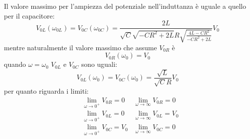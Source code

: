 Il valore massimo per l'ampiezza del potenziale nell'induttanza è uguale a quello per il capacitore:
\begin{equation}
  V_{0L}(\omega_{0L})=V_{0C}(\omega_{0C})=\frac{2L}{\sqrt{C}\sqrt{-CR^2+2L}R\sqrt{\frac{4L-CR^2}{-CR^2+2L}}}V_0
\end{equation}
mentre naturalmente il valore massimo che assume $V_{0R}$ è
\begin{equation}
  V_{0R}(\omega_0)=V_0
\end{equation}
quando $\omega=\omega_0$ $V_{0L}$ e $V_{0C}$ sono uguali:
\begin{equation}
  V_{0L}(\omega_0)=V_{0C}(\omega_0)=\frac{\sqrt{L}}{\sqrt{C}R}V_0
\end{equation}
per quanto riguarda i limiti:
\begin{subequations}
  \begin{align}
     & \lim_{\omega\to 0^+}V_{0R}=0   & \lim_{\omega\to \infty}V_{0R}=0   \\
     & \lim_{\omega\to 0^+}V_{0L}=0   & \lim_{\omega\to \infty}V_{0L}=V_0 \\
     & \lim_{\omega\to 0^+}V_{0C}=V_0 & \lim_{\omega\to \infty}V_{0C}=0
  \end{align}
\end{subequations}

